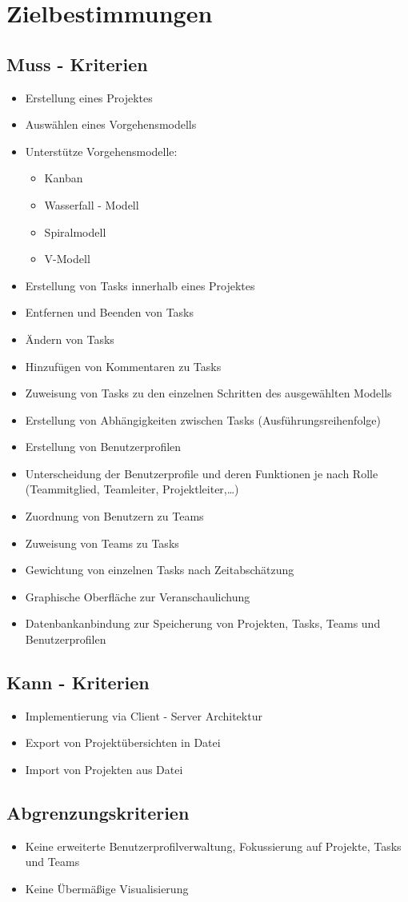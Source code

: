 
\section{Zielbestimmungen}

\subsection{Muss - Kriterien}
\begin{itemize}
	\item Erstellung eines Projektes
	\item Auswählen eines Vorgehensmodells
	\item Unterstütze Vorgehensmodelle:
	\begin{itemize}
		\item Kanban
		\item Wasserfall - Modell
		\item Spiralmodell
		\item V-Modell
	\end{itemize}
	\item Erstellung von Tasks innerhalb eines Projektes
	\item Entfernen und Beenden von Tasks
	\item Ändern von Tasks
	\item Hinzufügen von Kommentaren zu Tasks
	\item Zuweisung von Tasks zu den einzelnen Schritten des ausgewählten Modells
	\item Erstellung von Abhängigkeiten zwischen Tasks (Ausführungsreihenfolge)
	\item Erstellung von Benutzerprofilen
	\item Unterscheidung der Benutzerprofile und deren Funktionen je nach Rolle \\ (Teammitglied, Teamleiter, Projektleiter,\dots)
	\item Zuordnung von Benutzern zu Teams
	\item Zuweisung von Teams zu Tasks
	\item Gewichtung von einzelnen Tasks nach Zeitabschätzung
	\item Graphische Oberfläche zur Veranschaulichung
	\item Datenbankanbindung zur Speicherung von Projekten, Tasks, Teams und Benutzerprofilen
\end{itemize}

\subsection{Kann - Kriterien}
	\begin{itemize}
		\item Implementierung via Client - Server Architektur
		\item Export von Projektübersichten in Datei
		\item Import von Projekten aus Datei
	\end{itemize}

\subsection{Abgrenzungskriterien}
\begin{itemize}
	\item Keine erweiterte Benutzerprofilverwaltung, Fokussierung auf Projekte, Tasks und Teams
	\item Keine Übermäßige Visualisierung
\end{itemize}